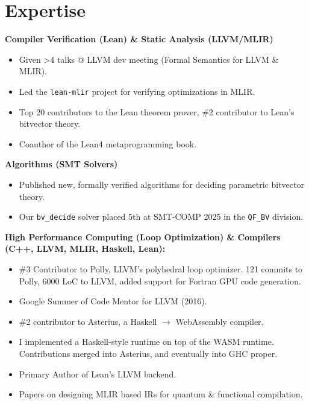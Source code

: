 \documentclass[10pt,a4paper,sans,colorlinks]{moderncv}        %
\newcommand{\qfbv}{\texttt{QF\_BV}}
\newcommand{\bvdecide}{\texttt{bv\_decide}}
\begin{document}
\makecvtitle


\section{Expertise}

\textbf{Compiler Verification (Lean) \& Static Analysis (LLVM/MLIR)}
\begin{itemize}
\item Given >4 talks @ LLVM dev meeting (Formal Semantics for LLVM \& MLIR).
\item Led the \texttt{lean-mlir} project for verifying optimizations in MLIR.
\item Top 20 contributors to the Lean theorem prover, \#2 contributor to Lean's bitvector theory.
\item Coauthor of the Lean4 metaprogramming book.
\end{itemize}

\textbf{Algorithms (SMT Solvers)}
\begin{itemize}
\item Published new, formally verified algorithms for deciding parametric bitvector theory.
\item Our \bvdecide{} solver placed 5th at SMT-COMP 2025 in the \qfbv{} division.
\end{itemize}

\textbf{High Performance Computing (Loop Optimization) \& Compilers (C++, LLVM, MLIR, Haskell, Lean):}
\begin{itemize}
\item \#3 Contributor to Polly, LLVM's polyhedral loop optimizer. 121 commits to Polly, 6000 LoC to LLVM, added support for Fortran GPU code generation.
\item Google Summer of Code Mentor for LLVM (2016).
\item \#2 contributor to Asterius, a Haskell $\to$ WebAssembly compiler.
\item I implemented a Haskell-style runtime on top of the WASM runtime. Contributions merged into Asterius, and eventually into GHC proper.
\item Primary Author of Lean's LLVM backend.
\item Papers on designing MLIR based IRs for quantum \& functional compilation.
\end{itemize}
\end{document}

